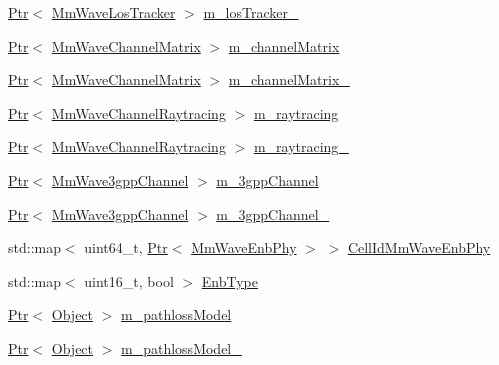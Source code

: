 \begin{DoxyCompactItemize}
\item 
\hyperlink{classns3_1_1Ptr}{Ptr}$<$ \hyperlink{classns3_1_1MmWaveLosTracker}{Mm\+Wave\+Los\+Tracker} $>$ \hyperlink{classns3_1_1MmWaveHelper_a69ccf3ffeee48b44244b478aba4eba18}{m\+\_\+los\+Tracker\+\_}
\item 
\hyperlink{classns3_1_1Ptr}{Ptr}$<$ \hyperlink{classns3_1_1MmWaveChannelMatrix}{Mm\+Wave\+Channel\+Matrix} $>$ \hyperlink{classns3_1_1MmWaveHelper_a731a9e28a12edacd78b96800025db070}{m\+\_\+channel\+Matrix}
\item 
\hyperlink{classns3_1_1Ptr}{Ptr}$<$ \hyperlink{classns3_1_1MmWaveChannelMatrix}{Mm\+Wave\+Channel\+Matrix} $>$ \hyperlink{classns3_1_1MmWaveHelper_af2907a9f5719984dfef74e3736e35bc5}{m\+\_\+channel\+Matrix\+\_}
\item 
\hyperlink{classns3_1_1Ptr}{Ptr}$<$ \hyperlink{classns3_1_1MmWaveChannelRaytracing}{Mm\+Wave\+Channel\+Raytracing} $>$ \hyperlink{classns3_1_1MmWaveHelper_a99e1ebbb84d122ea60a9fe7c1bb44528}{m\+\_\+raytracing}
\item 
\hyperlink{classns3_1_1Ptr}{Ptr}$<$ \hyperlink{classns3_1_1MmWaveChannelRaytracing}{Mm\+Wave\+Channel\+Raytracing} $>$ \hyperlink{classns3_1_1MmWaveHelper_a4fcc697a0b40deaa9bd75ead1c4297d9}{m\+\_\+raytracing\+\_}
\item 
\hyperlink{classns3_1_1Ptr}{Ptr}$<$ \hyperlink{classns3_1_1MmWave3gppChannel}{Mm\+Wave3gpp\+Channel} $>$ \hyperlink{classns3_1_1MmWaveHelper_a1cbb083568aa048da48260725e3cf4a4}{m\+\_\+3gpp\+Channel}
\item 
\hyperlink{classns3_1_1Ptr}{Ptr}$<$ \hyperlink{classns3_1_1MmWave3gppChannel}{Mm\+Wave3gpp\+Channel} $>$ \hyperlink{classns3_1_1MmWaveHelper_a708ff94e1399ab339e634dc7d4a5b44d}{m\+\_\+3gpp\+Channel\+\_}
\item 
std\+::map$<$ uint64\+\_\+t, \hyperlink{classns3_1_1Ptr}{Ptr}$<$ \hyperlink{classns3_1_1MmWaveEnbPhy}{Mm\+Wave\+Enb\+Phy} $>$ $>$ \hyperlink{classns3_1_1MmWaveHelper_af1bd1010ff8be40be5e86c076acf116d}{Cell\+Id\+Mm\+Wave\+Enb\+Phy}
\item 
std\+::map$<$ uint16\+\_\+t, bool $>$ \hyperlink{classns3_1_1MmWaveHelper_a5da34e3048341219417e4e2c154527e5}{Enb\+Type}
\item 
\hyperlink{classns3_1_1Ptr}{Ptr}$<$ \hyperlink{classns3_1_1Object}{Object} $>$ \hyperlink{classns3_1_1MmWaveHelper_a4de60027f5a256fe51033e6d6803e9b0}{m\+\_\+pathloss\+Model}
\item 
\hyperlink{classns3_1_1Ptr}{Ptr}$<$ \hyperlink{classns3_1_1Object}{Object} $>$ \hyperlink{classns3_1_1MmWaveHelper_a463070ab19ee9776262439eda4edf3e2}{m\+\_\+pathloss\+Model\+\_}

\end{DoxyCompactItemize}
